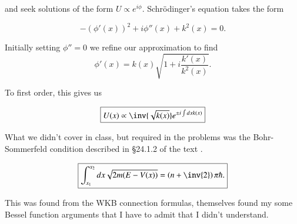 and seek solutions of the form $U \propto e^{i\phi}$.  Schr\"{o}dinger's equation takes the form

\begin{equation}\label{eqn:qmTwoReview:690}
- (\phi'(x))^2 + i \phi''(x) + k^2(x) = 0.
\end{equation}

Initially setting $\phi'' = 0$ we refine our approximation to find
\begin{equation}\label{eqn:qmTwoReview:710}
\phi'(x) 
= k(x) \sqrt{ 1 + i \frac{k'(x)}{k^2(x)} } .
\end{equation}

To first order, this gives us

\begin{equation}\label{eqn:qmTwoReview:730}
\boxed{
U(x) \propto \inv{\sqrt{k(x)}} e^{\pm i \int dx k(x)} 
}
\end{equation}

What we didn't cover in class, but required in the problems was the Bohr-Sommerfeld condition described in \S 24.1.2 of the text \cite{desai2009quantum}.

\begin{equation}\label{eqn:qmTwoReview:730b}
\boxed{
\int_{x_1}^{x_2} dx \sqrt{ 2m (E - V(x))} = \left( n + \inv{2} \right) \pi \hbar.
}
\end{equation}

This was found from the WKB connection formulas, themselves found my some Bessel function arguments that I have to admit that I didn't understand.

%

\EndArticle
